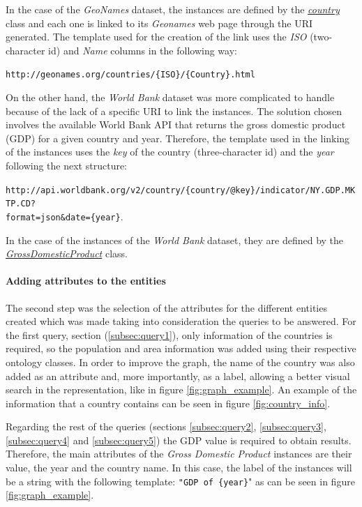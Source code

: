 \documentclass[11pt]{article}
\begin{document}
In the case of the \textit{GeoNames} dataset, the instances are defined by the \href{http://mappings.dbpedia.org/server/ontology/classes/Country}{\textit{country}} class and each one is linked to its \textit{Geonames} web page through the URI generated. The template used for the creation of the link uses the \textit{ISO} (two-character id) and \textit{Name} columns in the following way: 

{\small\texttt{http://geonames.org/countries/\{ISO\}/\{Country\}.html}}

On the other hand, the \textit{World Bank} dataset was more complicated to handle because of the lack of a specific URI to link the instances. The solution chosen involves the available World Bank API that returns the gross domestic product (GDP) for a given country and year. Therefore, the template used in the linking of the instances uses the \textit{key} of the country (three-character id) and the \textit{year} following the next structure: 

{\small\texttt{http://api.worldbank.org/v2/country/\{country/@key\}/indicator/NY.GDP.MKTP.CD?\\format=json\&date=\{year\}}}. 

In the case of the instances of the \textit{World Bank} dataset, they are defined by the \href{http://mappings.dbpedia.org/server/ontology/classes/GrossDomesticProduct}{\textit{GrossDomesticProduct}} class.

\paragraph{Adding attributes to the entities}

The second step was the selection of the attributes for the different entities created which was made taking into consideration the queries to be answered. For the first query, section (\ref{subsec:query1}), only information of the countries is required, so the population and area information was added using their respective ontology classes. In order to improve the graph, the name of the country was also added as an attribute and, more importantly, as a label, allowing a better visual search in the representation, like in figure \ref{fig:graph_example}. An example of the information that a country contains can be seen in figure \ref{fig:country_info}.

Regarding the rest of the queries (sections \ref{subsec:query2}, \ref{subsec:query3}, \ref{subsec:query4} and \ref{subsec:query5}) the GDP value is required to obtain results. Therefore, the main attributes of the \textit{Gross Domestic Product} instances are their value, the year and the country name. In this case, the label of the instances will be a string with the following template: \texttt{"GDP of \{year\}}" as can be seen in figure \ref{fig:graph_example}.
\end{document}
